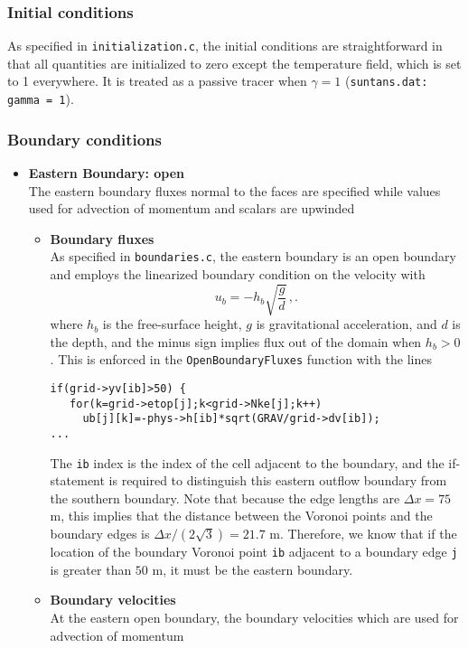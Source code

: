 \subsubsection{Initial conditions}

As specified in \verb+initialization.c+, the initial conditions are straightforward in
that all quantities are initialized to zero except the temperature field, which is set to 1
everywhere.  It is treated as a passive
tracer when $\gamma=1$ (\verb+suntans.dat: gamma = 1+).

\subsubsection{Boundary conditions}

\begin{itemize}
\item[] {\bf Eastern Boundary: open}\\
The eastern boundary fluxes normal to the faces are specified while values used for
advection of momentum and scalars are upwinded
\begin{itemize}
\item[] {\bf Boundary fluxes}\\
As specified in \verb+boundaries.c+, the eastern boundary is an open boundary and employs the
linearized boundary condition on the velocity with
\[ u_b = -h_b\sqrt{\frac{g}{d}} \,,.\]
where $h_b$ is the free-surface height, $g$ is gravitational acceleration, and $d$ is
the depth, and the minus sign implies flux out of the domain when $h_b>0$.
This is enforced in the \verb+OpenBoundaryFluxes+ function with the lines
\begin{verbatim}
if(grid->yv[ib]>50) {
   for(k=grid->etop[j];k<grid->Nke[j];k++) 
     ub[j][k]=-phys->h[ib]*sqrt(GRAV/grid->dv[ib]);
...
\end{verbatim}
The \verb+ib+ index is the index of the cell adjacent to the boundary, and the if-statement
is required to distinguish this eastern outflow boundary from the southern boundary.  Note
that because the edge lengths are $\Delta x = 75$ m, this implies that the distance between the Voronoi points
and the boundary edges is $\Delta x/(2\sqrt{3})=21.7$ m.  Therefore, we know that if the location
of the boundary Voronoi point \verb+ib+ adjacent to a boundary edge \verb+j+ 
is greater than $50$ m, it must be the eastern boundary.
\item[] {\bf Boundary velocities}\\
At the eastern open boundary, the boundary velocities which are used for advection of momentum

\end{itemize}
\end{itemize}
